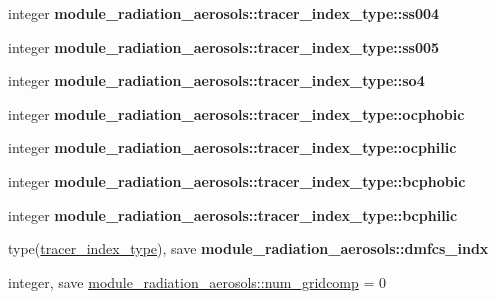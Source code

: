 \begin{DoxyCompactItemize}
integer {\bfseries module\+\_\+radiation\+\_\+aerosols\+::tracer\+\_\+index\+\_\+type\+::ss004}
\item 
\mbox{\label{group__module__radiation__aerosols_ga3c67144cb8aeedfb6c51c474a5072605}} 
integer {\bfseries module\+\_\+radiation\+\_\+aerosols\+::tracer\+\_\+index\+\_\+type\+::ss005}
\item 
\mbox{\label{group__module__radiation__aerosols_gaa73b4be9d303cfce2c00407204c5f930}} 
integer {\bfseries module\+\_\+radiation\+\_\+aerosols\+::tracer\+\_\+index\+\_\+type\+::so4}
\item 
\mbox{\label{group__module__radiation__aerosols_ga3ace1c1bbade423efd216e676511c470}} 
integer {\bfseries module\+\_\+radiation\+\_\+aerosols\+::tracer\+\_\+index\+\_\+type\+::ocphobic}
\item 
\mbox{\label{group__module__radiation__aerosols_ga95e99f68fc7344f78f2ee316bc447651}} 
integer {\bfseries module\+\_\+radiation\+\_\+aerosols\+::tracer\+\_\+index\+\_\+type\+::ocphilic}
\item 
\mbox{\label{group__module__radiation__aerosols_ga4b1c1a1b44b5eb68ec19abb48e748fa0}} 
integer {\bfseries module\+\_\+radiation\+\_\+aerosols\+::tracer\+\_\+index\+\_\+type\+::bcphobic}
\item 
\mbox{\label{group__module__radiation__aerosols_ga776ae744bfaad492a1aeccf32864d1a0}} 
integer {\bfseries module\+\_\+radiation\+\_\+aerosols\+::tracer\+\_\+index\+\_\+type\+::bcphilic}
\item 
\mbox{\label{group__module__radiation__aerosols_gad6c4782fbaae13df20891197b67568ec}} 
type(\hyperlink{structmodule__radiation__aerosols_1_1tracer__index__type}{tracer\+\_\+index\+\_\+type}), save {\bfseries module\+\_\+radiation\+\_\+aerosols\+::dmfcs\+\_\+indx}
\item 
\mbox{\label{group__module__radiation__aerosols_ga6ddeb7b34ad2d6ab1575be3520e85891}} 
integer, save \hyperlink{group__module__radiation__aerosols_ga6ddeb7b34ad2d6ab1575be3520e85891}{module\+\_\+radiation\+\_\+aerosols\+::num\+\_\+gridcomp} = 0

\end{DoxyCompactItemize}
